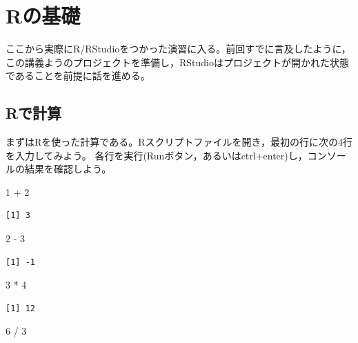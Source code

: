 \documentclass[
  a4paper,
]{ltjsbook}
\newenvironment{Shaded}{\begin{snugshade}}{\end{snugshade}}
\newcommand{\DecValTok}[1]{\textcolor[rgb]{0.68,0.00,0.00}{#1}}
\newcommand{\SpecialCharTok}[1]{\textcolor[rgb]{0.37,0.37,0.37}{#1}}
\begin{document}

\chapter{Rの基礎}\label{sec-Rbase}

ここから実際にR/RStudioをつかった演習に入る。前回すでに言及したように，この講義ようのプロジェクトを準備し，RStudioはプロジェクトが開かれた状態であることを前提に話を進める。

\section{Rで計算}\label{rux3067ux8a08ux7b97}

まずはRを使った計算である。Rスクリプトファイルを開き，最初の行に次の4行を入力してみよう。
各行を実行(Runボタン，あるいはctrl+enter)し，コンソールの結果を確認しよう。

\begin{Shaded}
\begin{Highlighting}[]
\DecValTok{1} \SpecialCharTok{+} \DecValTok{2}
\end{Highlighting}
\end{Shaded}

\begin{verbatim}
[1] 3
\end{verbatim}

\begin{Shaded}
\begin{Highlighting}[]
\DecValTok{2} \SpecialCharTok{{-}} \DecValTok{3}
\end{Highlighting}
\end{Shaded}

\begin{verbatim}
[1] -1
\end{verbatim}

\begin{Shaded}
\begin{Highlighting}[]
\DecValTok{3} \SpecialCharTok{*} \DecValTok{4}
\end{Highlighting}
\end{Shaded}

\begin{verbatim}
[1] 12
\end{verbatim}

\begin{Shaded}
\begin{Highlighting}[]
\DecValTok{6} \SpecialCharTok{/} \DecValTok{3}
\end{Highlighting}
\end{Shaded}
\end{document}
